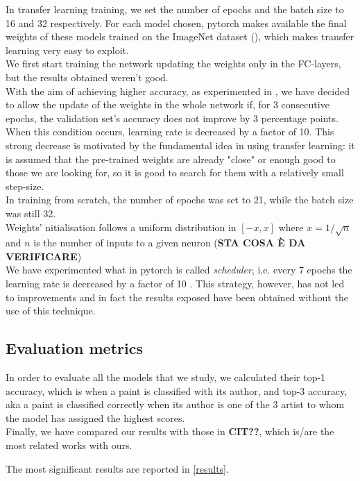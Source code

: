 \documentclass{article}
\begin{document}
In transfer learning training, we set the number of epochs and the batch size to 16 and 32 respectively.  For each model chosen, pytorch makes available the final weights of these models trained on the ImageNet dataset (\cite{imagenet}), which makes transfer learning very easy to exploit.\\
We first start training the network updating the weights only in the FC-layers, but the results obtained weren't good.\\
With the aim of achieving higher accuracy, as experimented in \cite{ArtistIdCNN406}, we have decided to allow the update of the weights in the whole network if, for 3 consecutive epochs, the validation set's accuracy does not improve by 3 percentage points. When this condition occurs, learning rate is decreased by a factor of 10. This strong decrease is motivated by the fundamental idea in using transfer learning: it is assumed that the pre-trained weights are already "close" or enough good to those we are looking for, so it is good to search for them with a relatively small step-size.
\\

In training from scratch, the number of epochs was set to 21, while the batch size was still 32.\\ 
Weights' nitialisation follows a uniform distribution in $[-x, x]$ where $x=1/\sqrt n$ and $n$ is the number of inputs to a given neuron (\textbf{STA COSA È DA VERIFICARE})\\
We have experimented what in pytorch is called \textit{scheduler}, i.e. every 7 epochs the learning rate is decreased by a factor of 10 . This strategy, however, has not led to improvements and in fact the results exposed have been obtained without the use of this technique.

\subsection{Evaluation metrics}
In order to evaluate all the models that we study, we calculated their top-1 accuracy, which is when a paint is classified with its author, and top-3 accuracy, aka a paint is classified correctly when its author is one of the 3 artist to whom the model has assigned the highest scores.\\
Finally, we have compared our results with those in \textbf{CIT??}, which is/are the most related works with ours. 

The most significant results are reported in \ref{results}.
\end{document}
